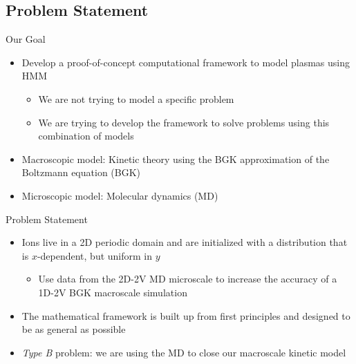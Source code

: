 \documentclass{beamer}
\begin{document}
	\subsection{Problem Statement}
	\begin{frame}{Our Goal}
		\begin{itemize}
			\item  Develop a proof-of-concept computational framework to model plasmas using HMM\vspace{1em}
			\begin{itemize}
				\item  We are not trying to model a specific problem\vspace{1em}				\item  We are trying to develop the framework to solve problems using this combination of models\vspace{1em}
			\end{itemize}
			\item  Macroscopic model: Kinetic theory using the BGK approximation of the Boltzmann equation (BGK)\vspace{1em}
			\item  Microscopic model: Molecular dynamics (MD)
		\end{itemize}
	\end{frame}
	
	\begin{frame}{Problem Statement}
		\begin{itemize}
			\item  Ions live in a 2D periodic domain and are initialized with a distribution that is $x$-dependent, but uniform in $y$
			\vspace{0.5em}
			\begin{itemize}
				\item Use data from the 2D-2V MD microscale to increase the accuracy of a 1D-2V BGK macroscale simulation
			\end{itemize}
			\vspace{0.5em}
			\item  The mathematical framework is built up from first principles and designed to be as general as possible
			\vspace{0.5em}
			\item  \emph{Type B} problem: we are using the MD to close our macroscale kinetic model
		\end{itemize}
	\end{frame}
	
\end{document}
